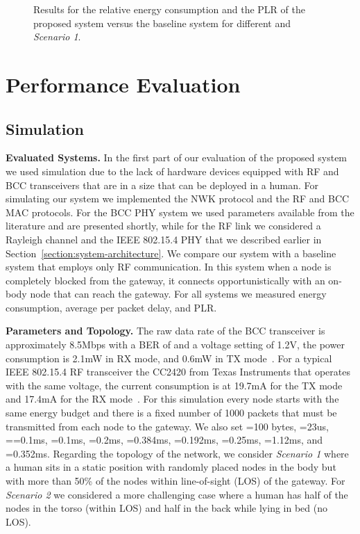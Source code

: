 \documentclass[10pt]{IEEEtran}
\newcounter{section:outage-analysis}
\begin{document}
\begin{figure}[t]
\begin{center}
\caption{Results for the relative energy consumption and the PLR of the proposed system versus the baseline system for different  and \emph{Scenario 1}.}
  \label{fig:energy-vs-load}
\end{center}
\end{figure}

\section{Performance Evaluation}
\label{section:experiments}
\subsection{Simulation}
\textbf{Evaluated Systems.} In the first part of our evaluation of the proposed system we used simulation due to the lack of hardware devices equipped with RF and BCC transceivers that are in a size that can be deployed in a human. For simulating our system we implemented the NWK protocol and the RF and BCC MAC protocols. For the BCC PHY system we used parameters available from the literature and are presented shortly, while for the RF link we considered a Rayleigh channel and the IEEE 802.15.4 PHY that we described earlier in Section~\ref{section:system-architecture}. We compare our system with a baseline system that employs only RF communication. In this system when a node is completely blocked from the gateway, it connects opportunistically with an on-body node that can reach the gateway. For all systems we measured energy consumption, average per packet delay, and PLR.

\textbf{Parameters and Topology.} The raw data rate of the BCC transceiver is approximately 8.5Mbps with a BER of  and a voltage setting of 1.2V, the power consumption is 2.1mW in RX mode, and 0.6mW in TX mode~\cite{fazzi09}. For a typical IEEE 802.15.4 RF transceiver the CC2420 from Texas Instruments that operates with the same voltage, the current consumption is  at 19.7mA for the TX mode and 17.4mA for the RX mode~\cite{cc2420}. For this simulation every node starts with the same energy budget and there is a fixed number of 1000 packets that must be transmitted from each node to the gateway. We also set =100 bytes, =23us, ==0.1ms, =0.1ms, =0.2ms, =0.384ms, =0.192ms, =0.25ms, =1.12ms, and =0.352ms. Regarding the topology of the network, we consider \emph{Scenario 1} where a human sits in a static position with randomly placed nodes in the body but with more than 50\% of the nodes within line-of-sight (LOS) of the gateway. For \emph{Scenario 2} we considered a more challenging case where a human has half of the nodes in the torso (within LOS) and half in the back while lying in bed (no LOS).
\end{document}
